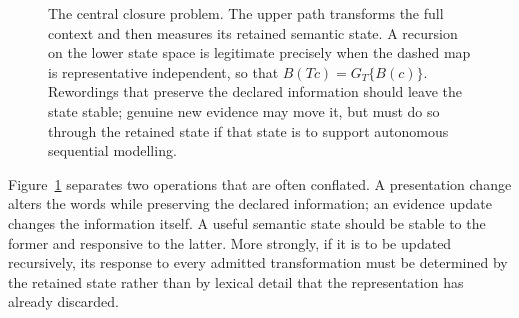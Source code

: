 \documentclass[11pt]{article}
\begin{document}
\begin{figure}[t]
\centering
{}
\caption{The central closure problem.  The upper path transforms the full
context and then measures its retained semantic state.  A recursion on the
lower state space is legitimate precisely when the dashed map is
representative independent, so that $B(Tc)=G_T\{B(c)\}$.  Rewordings that
preserve the declared information should leave the state stable; genuine new
evidence may move it, but must do so through the retained state if that state
is to support autonomous sequential modelling.}
\label{fig:closure-problem}
\end{figure}

Figure~\ref{fig:closure-problem} separates two operations that are often
conflated.  A presentation change alters the words while preserving the
declared information; an evidence update changes the information itself.  A
useful semantic state should be stable to the former and responsive to the
latter.  More strongly, if it is to be updated recursively, its response to
every admitted transformation must be determined by the retained state rather
than by lexical detail that the representation has already discarded.
\end{document}
